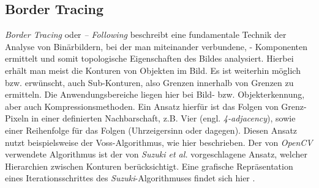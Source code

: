 \subsection{Border Tracing}
\textit{Border Tracing} oder \textit{-- Following} beschreibt eine fundamentale Technik der Analyse von Binärbildern, bei der man miteinander verbundene,  \dq - Komponenten ermittelt und somit topologische Eigenschaften des Bildes analysiert. Hierbei erhält man meist die Konturen von Objekten im Bild. Es ist weiterhin möglich bzw. erwünscht, auch Sub-Konturen, also Grenzen innerhalb von Grenzen zu ermitteln. Die Anwendungsbereiche liegen hier bei Bild- bzw. Objekterkennung, aber auch Kompressionsmethoden\cite{suzuki_contour}. Ein Ansatz hierfür ist das Folgen von Grenz-Pixeln in einer definierten Nachbarschaft, z.B. Vier (engl. \textit{4-adjacency}), sowie einer Reihenfolge für das Folgen (Uhrzeigersinn oder dagegen). Diesen Ansatz nutzt beispielsweise der Voss-Algorithmus, wie hier beschrieben\cite[S.\. 115f.]{Klette14}.
Der von \textit{OpenCV} verwendete Algorithmus ist der von \textit{Suzuki et al.} vorgeschlagene Ansatz, welcher Hierarchien zwischen Konturen berücksichtigt. Eine grafische Repräsentation eines Iterationsschrittes des \textit{Suzuki}-Algorithmuses findet sich hier \cite{suzuki_online}.

